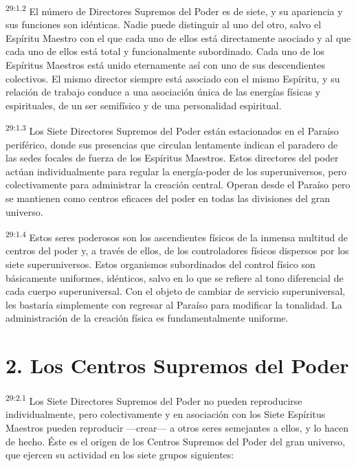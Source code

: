 \par
\textsuperscript{29:1.2} El número de Directores Supremos del Poder es de siete, y su apariencia y sus funciones son idénticas. Nadie puede distinguir al uno del otro, salvo el Espíritu Maestro con el que cada uno de ellos está directamente asociado y al que cada uno de ellos está total y funcionalmente subordinado. Cada uno de los Espíritus Maestros está unido eternamente así con uno de sus descendientes colectivos. El mismo director siempre está asociado con el mismo Espíritu, y su relación de trabajo conduce a una asociación única de las energías físicas y espirituales, de un ser semifísico y de una personalidad espiritual.

\par
\textsuperscript{29:1.3} Los Siete Directores Supremos del Poder están estacionados en el Paraíso periférico, donde sus presencias que circulan lentamente indican el paradero de las sedes focales de fuerza de los Espíritus Maestros. Estos directores del poder actúan individualmente para regular la energía-poder de los superuniversos, pero colectivamente para administrar la creación central. Operan desde el Paraíso pero se mantienen como centros eficaces del poder en todas las divisiones del gran universo.

\par
\textsuperscript{29:1.4} Estos seres poderosos son los ascendientes físicos de la inmensa multitud de centros del poder y, a través de ellos, de los controladores físicos dispersos por los siete superuniversos. Estos organismos subordinados del control físico son básicamente uniformes, idénticos, salvo en lo que se refiere al tono diferencial de cada cuerpo superuniversal. Con el objeto de cambiar de servicio superuniversal, les bastaría simplemente con regresar al Paraíso para modificar la tonalidad. La administración de la creación física es fundamentalmente uniforme.

\section*{2. Los Centros Supremos del Poder}
\par
\textsuperscript{29:2.1} Los Siete Directores Supremos del Poder no pueden reproducirse individualmente, pero colectivamente y en asociación con los Siete Espíritus Maestros pueden reproducir ---crear--- a otros seres semejantes a ellos, y lo hacen de hecho. Éste es el origen de los Centros Supremos del Poder del gran universo, que ejercen su actividad en los siete grupos siguientes:

